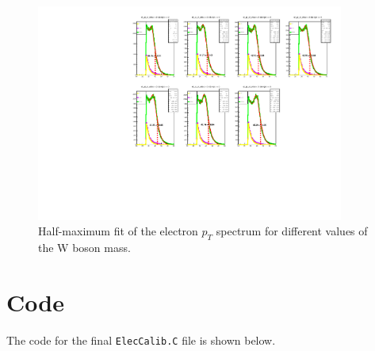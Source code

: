 \documentclass[a4paper]{report}
\numberwithin{equation}{section}
\begin{document}
\begin{figure}[htpb]
    \centering
    \includegraphics[width=0.9\textwidth]{hw_plots.pdf}
    \caption{Half-maximum fit of the electron $p_T$ spectrum for different values of the W boson mass.}
    \label{fig:hm_allmass}
\end{figure}



\chapter{Code} \label{chap:appendix_code}

The code for the final \texttt{ElecCalib.C} file is shown below. 
\end{document}
